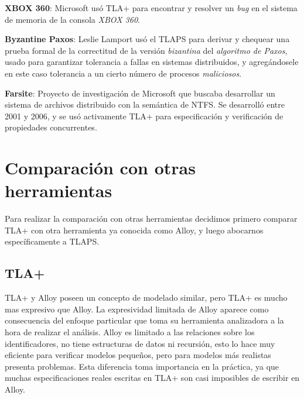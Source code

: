 \documentclass[spanish]{llncs}
\begin{document}
\textbf{XBOX 360}: Microsoft usó TLA+ para encontrar y resolver un \textit{bug} en el sistema de memoria de la consola \textit{XBOX 360}. \cite{xbox360}

\textbf{Byzantine Paxos}: Leslie Lamport usó el TLAPS para derivar y chequear una prueba formal de la correctitud de la versión \textit{bizantina} del \textit{algoritmo de Paxos},
usado para garantizar tolerancia a fallas en sistemas distribuidos, y agregándosele en este caso tolerancia a un cierto número de procesos \textit{maliciosos}. \cite{byzpaxos}

\textbf{Farsite}: Proyecto de investigación de Microsoft que buscaba desarrollar un sistema de archivos distribuido con la semántica de NTFS.
Se desarrolló entre 2001 y 2006, y se usó activamente TLA+ para especificación y verificación de propiedades concurrentes. \cite{farsite}

\section{Comparación con otras herramientas}
Para realizar la comparación con otras herramientas decidimos primero comparar TLA+ con otra herramienta ya conocida como Alloy,
y luego abocarnos específicamente a TLAPS.

  \subsection{TLA+}
  TLA+ y Alloy poseen un concepto de modelado similar, pero TLA+ es mucho mas expresivo que Alloy. La expresividad limitada de Alloy aparece como consecuencia del enfoque particular que toma su herramienta analizadora a la hora de realizar el análisis. Alloy es limitado a las relaciones sobre los identificadores, no tiene estructuras de datos ni recursión, esto lo hace muy eficiente para verificar modelos pequeños, pero para modelos más realistas presenta problemas. 
  Esta diferencia toma importancia en la práctica, ya que muchas especificaciones reales escritas en TLA+ son 
  casi imposibles de escribir en Alloy.
\end{document}

